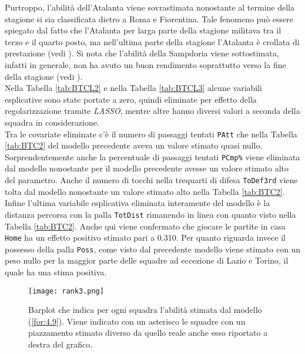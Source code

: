 Purtroppo, l'abilità dell'Atalanta viene sovrastimata nonostante al termine della stagione si sia classificata dietro a Roma e Fiorentina. Tale fenomeno può essere spiegato dal fatto che l'Atalanta per larga parte della stagione militava tra il terzo e il quarto posto, ma nell'ultima parte della stagione l'Atalanta è crollata di prestazione (vedi \textit{\cite{storyAta}}). Si nota che l'abilità della Sampdoria viene sottostimata, infatti in generale, non ha avuto un buon rendimento soprattutto verso la fine della stagione (vedi \textit{\cite{storySamp}}).\\
Nella Tabella \ref{tab:BTCL2} e nella Tabella \ref{tab:BTCL3} alcune variabili esplicative sono state portate a zero, quindi eliminate per effetto della regolarizzazione tramite \emph{LASSO}, mentre altre hanno diversi valori a seconda della squadra in considerazione. \\
Tra le covariate eliminate c'è il numero di passaggi tentati \texttt{PAtt} che nella Tabella \ref{tab:BTC2} del modello precedente aveva un valore stimato quasi nullo. Sorprendentemente anche la percentuale di passaggi tentati \texttt{PCmp\%} viene eliminata dal modello nonostante per il modello precedente avesse un valore stimato alto del parametro. Anche il numero di tocchi nella trequarti di difesa \texttt{ToDef3rd} viene tolta dal modello nonostante un valore stimato alto nella Tabella \ref{tab:BTC2}. Infine l'ultima variabile esplicativa eliminata interamente del modello è la distanza percorsa con la palla \texttt{TotDist} rimanendo in linea con quanto visto nella Tabella \ref{tab:BTC2}.
Anche qui viene confermato che giocare le partite in casa \texttt{Home} ha un effetto positivo stimato pari a 0.310. Per quanto riguarda invece il possesso della palla \texttt{Poss}, come visto dal precedente modello viene stimato con un peso nullo per la maggior parte delle squadre ad eccezione di Lazio e Torino, il quale ha una stima positiva.

\begin{sidewaysfigure} 
	\centering
	\begin{center}
		\texttt{[image: rank3.png]}
		\caption{Barplot che indica per ogni squadra l'abilità stimata dal modello (\ref{for:4.9}). Viene indicato con un asterisco le squadre con un piazzamento stimato diverso da quello reale anche esso riportato a destra del grafico.} \label{tab:BTCL} 
	\end{center}
\end{sidewaysfigure}

